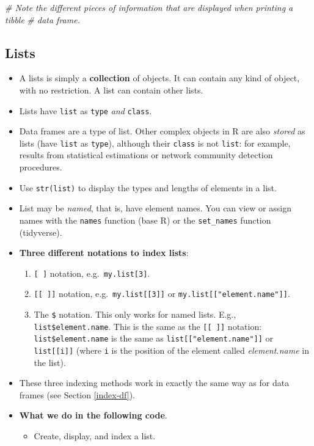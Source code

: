 \documentclass[
]{book}
\newenvironment{Shaded}{\begin{snugshade}}{\end{snugshade}}
\newcommand{\CommentTok}[1]{\textcolor[rgb]{0.56,0.35,0.01}{\textit{#1}}}
\providecommand{\tightlist}{%
  \setlength{\itemsep}{0pt}\setlength{\parskip}{0pt}}
\begin{document}
\begin{Shaded}
\begin{Highlighting}[]
\CommentTok{\# Note the different pieces of information that are displayed when printing a tibble}
\CommentTok{\# data frame.}
\end{Highlighting}
\end{Shaded}

\hypertarget{lists}{%
\subsection{Lists}\label{lists}}

\begin{itemize}
\tightlist
\item
  A lists is simply a \textbf{collection} of objects. It can contain any kind of object, with no restriction. A list can contain other lists.
\item
  Lists have \texttt{list} as \texttt{type} \emph{and} \texttt{class}.
\item
  Data frames are a type of list. Other complex objects in R are also \emph{stored} as lists (have \texttt{list} as \texttt{type}), although their \texttt{class} is not \texttt{list}: for example, results from statistical estimations or network community detection procedures.
\item
  Use \texttt{str(list)} to display the types and lengths of elements in a list.
\item
  List may be \emph{named}, that is, have element names. You can view or assign names with the \texttt{names} function (base R) or the \texttt{set\_names} function (tidyverse).
\item
  \textbf{Three different notations to index lists}:

  \begin{enumerate}
  \def\labelenumi{\arabic{enumi}.}
  \tightlist
  \item
    \texttt{{[}\ {]}} notation, e.g.~\texttt{my.list{[}3{]}}.
  \item
    \texttt{{[}{[}\ {]}{]}} notation, e.g.~\texttt{my.list{[}{[}3{]}{]}} or \texttt{my.list{[}{[}"element.name"{]}{]}}.
  \item
    The \texttt{\$} notation. This only works for named lists. E.g., \texttt{list\$element.name}. This is the same as the \texttt{{[}{[}\ {]}{]}} notation: \texttt{list\$element.name} is the same as \texttt{list{[}{[}"element.name"{]}{]}} or \texttt{list{[}{[}i{]}{]}} (where \texttt{i} is the position of the element called \emph{element.name} in the list).
  \end{enumerate}
\item
  These three indexing methods work in exactly the same way as for data frames (see Section \ref{index-df}).
\item
  \textbf{What we do in the following code}.

  \begin{itemize}
  \tightlist
  \item
    Create, display, and index a list.
  \end{itemize}
\end{itemize}
\end{document}
